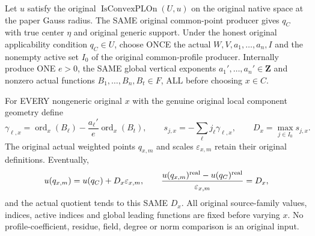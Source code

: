 \begin{theorem}
\label{thm:gauss-common-global-leading-convex-profiles}
\leanok
Let $u$ satisfy the original $\operatorname{IsConvexPLOn}(U,u)$ on the
original native space at the paper Gauss radius. The SAME original
common-point producer gives $q_C$ with true center $\eta$ and original
generic support. Under the honest original applicability condition
$q_C\in U$, choose ONCE the actual $W,V,a_1,\ldots,a_n,I$ and the
nonempty active set $I_0$ of the original common-profile producer.
Internally produce ONE $e>0$, the SAME global vertical exponents
$a_1',\ldots,a_n'\in\mathbf Z$ and nonzero actual functions
$B_1,\ldots,B_n,B_t\in F$, ALL before choosing $x\in C$.

For EVERY nongeneric original $x$ with the genuine original local
component geometry define
\[
 \gamma_{\ell,x}=\operatorname{ord}_x(B_\ell)
        -\frac{a_\ell'}e\operatorname{ord}_x(B_t),\qquad
 s_{j,x}=-\sum_\ell j_\ell\gamma_{\ell,x},\qquad
 D_x=\max_{j\in I_0}s_{j,x}.
\]
The original actual weighted points $q_{x,m}$ and scales
$\varepsilon_{x,m}$ retain their original definitions. Eventually,
\[
 u(q_{x,m})=u(q_C)+D_x\varepsilon_{x,m},\qquad
 \frac{u(q_{x,m})^{\rm real}-u(q_C)^{\rm real}}
      {\varepsilon_{x,m}}=D_x,
\]
and the actual quotient tends to this SAME $D_x$.
All original source-family values, indices, active indices and global
leading functions are fixed before varying $x$. No profile-coefficient,
residue, field, degree or norm comparison is an original input.
\end{theorem}

